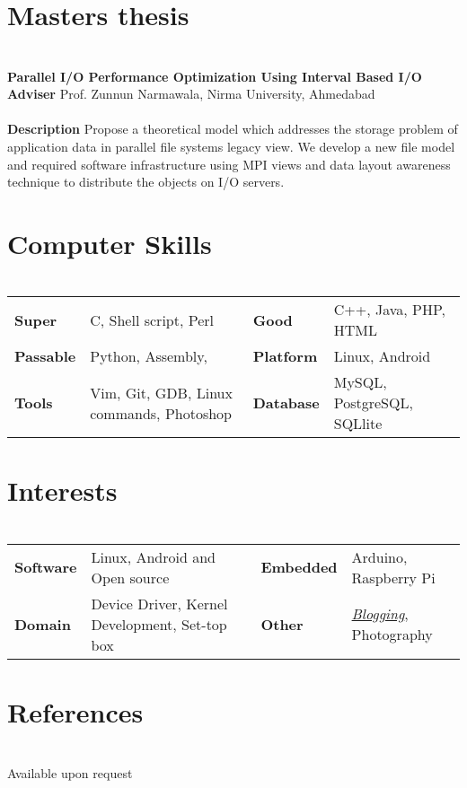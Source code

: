 \documentclass[margin,line]{res}
\newcommand{\datesection}[1]{\section{\textnormal{\scriptsize \textcolor{subtle}{#1}}}}
\begin{document}
\begin{resume}
\section{\sc Masters thesis}
\datesection{}
{\bf Parallel I/O Performance Optimization Using Interval Based I/O}\\
{\bf Adviser     } Prof. Zunnun Narmawala, Nirma University, Ahmedabad\\
\\
{\bf Description } Propose a theoretical model which addresses the storage problem of application data in parallel file systems legacy view. We develop a new file model and required software infrastructure using MPI views and data layout awareness technique to distribute
the objects on I/O servers.

\section{\sc Computer Skills}
\datesection{}
\begin{tabular}{@{}p{.5in}p{2.5in}p{0.5in}p{4in}}

{\bf Super   } &  C, Shell script, Perl           & {\bf Good    } & C++, Java, PHP, HTML\\
{\bf Passable} & Python, Assembly, & {\bf Platform} & Linux, Android\\
{\bf Tools} & Vim, Git, GDB, Linux commands, Photoshop & {\bf Database} & MySQL, PostgreSQL, SQLlite\\
\end{tabular}

\section{\sc Interests}
\datesection{}
\begin{tabular}{@{}p{.5in}p{2.5in}p{0.6in}p{4in}}

{\bf Software   } &  Linux, Android and Open source & {\bf Embedded   } & Arduino, Raspberry Pi\\
{\bf Domain} & Device Driver, Kernel Development, Set-top box& {\bf Other} & {\em \href{http://sanketparmar.in}{Blogging}}, Photography\\
\end{tabular}

\section{\sc References}
\datesection{}
Available upon request
\end{resume}
\end{document}
